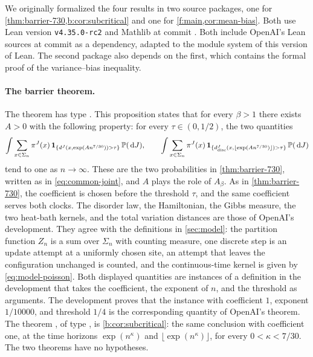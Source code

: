 We originally formalized the four results in two source packages, one for \cref{thm:barrier-730,b:cor:subcritical} and one for \cref{f:main,cor:mean-bias}. Both use Lean version \texttt{v4.35.0-rc2} and Mathlib at commit . Both include OpenAI's Lean sources at commit  as a dependency, adapted to the module system of this version of Lean. The second package also depends on the first, which contains the formal proof of the variance--bias inequality.

\paragraph{The barrier theorem.} The theorem  has type . This proposition states that for every $\beta>1$ there exists $A>0$ with the following property: for every $\tau\in(0,1/2)$, the two quantities
\[
 \int\sum_{x\in\Sigma_n}\pi^J(x)\,\mathbf 1_{\{d^J(x,\exp(An^{7/30}))>\tau\}}\,\mathbb P(\,\mathrm d J),\qquad
 \int\sum_{x\in\Sigma_n}\pi^J(x)\,\mathbf 1_{\{d^J_{\rm disc}(x,\lfloor\exp(An^{7/30})\rfloor)>\tau\}}\,\mathbb P(\,\mathrm d J)
\]
tend to one as $n\to\infty$. These are the two probabilities in \cref{thm:barrier-730}, written as in \eqref{eq:common-joint}, and $A$ plays the role of $A_\beta$. As in \cref{thm:barrier-730}, the coefficient is chosen before the threshold $\tau$, and the same coefficient serves both clocks. The disorder law, the Hamiltonian, the Gibbs measure, the two heat-bath kernels, and the total variation distances are those of OpenAI's development. They agree with the definitions in \cref{sec:model}: the partition function $Z_n$ is a sum over $\Sigma_n$ with counting measure, one discrete step is an update attempt at a uniformly chosen site, an attempt that leaves the configuration unchanged is counted, and the continuous-time kernel is given by \eqref{eq:model-poisson}. Both displayed quantities are instances of a definition in the development that takes the coefficient, the exponent of $n$, and the threshold as arguments. The development proves that the instance with coefficient $1$, exponent $1/10000$, and threshold $1/4$ is the corresponding quantity of OpenAI's theorem. The theorem , of type , is \cref{b:cor:subcritical}: the same conclusion with coefficient one, at the time horizons $\exp(n^\kappa)$ and $\lfloor\exp(n^\kappa)\rfloor$, for every $0<\kappa<7/30$. The two theorems have no hypotheses.

